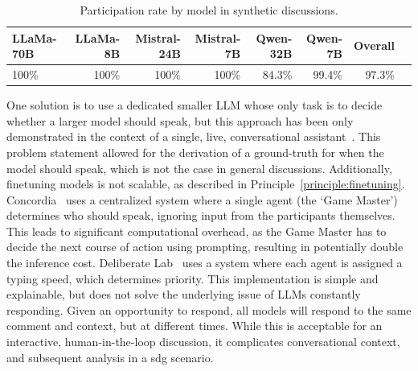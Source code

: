 \begin{table}[ht]
	\caption{Participation rate by model in synthetic discussions.}
	\label{tab:participation}
	\begin{tabular}{lrrrrrrr}
		\toprule
		LLaMa-70B & LLaMa-8B & Mistral-24B & Mistral-7B & Qwen-32B & Qwen-7B & Overall \\
		\midrule
		100\% & 100\% & 100\% & 100\% & 84.3\% & 99.4\% & 97.3\% \\
		\bottomrule
	\end{tabular}
\end{table}


One solution is to use a dedicated smaller LLM whose only task is to decide whether a larger model should speak, but this approach has been only demonstrated in the context of a single, live, conversational assistant~\cite{chen-etal-2025-llamapie}. This problem statement allowed for the derivation of a ground-truth for when the model should speak, which is not the case in general discussions. Additionally, finetuning models is not scalable, as described in Principle~\ref{principle:finetuning}. Concordia~\cite{Vezhnevets2023GenerativeAM} uses a centralized system where a single agent (the `Game Master') determines who should speak, ignoring input from the participants themselves. This leads to significant computational overhead, as the Game Master has to decide the next course of action using prompting, resulting in potentially double the inference cost. Deliberate Lab~\cite{Tsai_Deliberate_Lab_Open-Source_2025} uses a system where each agent is assigned a typing speed, which determines priority. This implementation is simple and explainable, but does not solve the underlying issue of LLMs constantly responding. Given an opportunity to respond, all models will respond to the same comment and context, but at different times. While this is acceptable for an interactive, human-in-the-loop discussion, it complicates conversational context, and subsequent analysis in a \ac{sdg} scenario.

